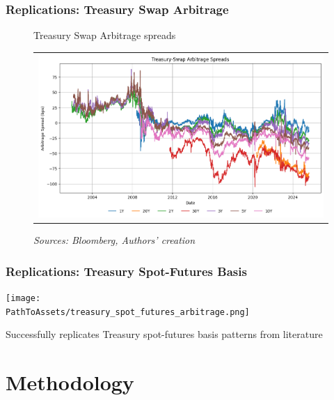 \documentclass[ignorenonframetext, 9pt]{beamer}
\begin{document}
\begin{frame}
    \frametitle{Replications: Treasury Swap Arbitrage}
    \begin{figure}[h!]
        \centering
        \caption{Treasury Swap Arbitrage spreads}
        \begin{tabular}{@{}c@{}}
          \includegraphics[width=.95\linewidth]{../docs_src/treasury_swap_arbitrage_spreads.png}
        \end{tabular}
        \caption*{\emph{Sources: Bloomberg, Authors' creation}}
        \label{fig:treasury_swap_arbitrage}
      \end{figure}      
\end{frame}

\begin{frame}
    \frametitle{Replications: Treasury Spot-Futures Basis}
    \centering
    \texttt{[image: \\PathToAssets/treasury\_spot\_futures\_arbitrage.png]}
  
    \vspace{0.3cm}
    Successfully replicates Treasury spot-futures basis patterns from literature
  \end{frame}
  

\section{Methodology}
\end{document}
